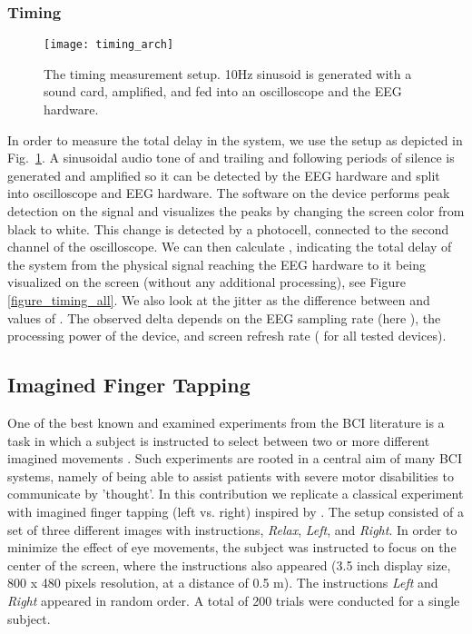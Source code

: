 \documentclass[10pt]{article}
\begin{document}
\begin{center}
		\subsubsection{Timing}
\begin{figure}[!t]
\centering
\texttt{[image: timing\_arch]}
\caption{The timing measurement setup. 10Hz sinusoid is generated with a sound card, amplified, and fed into an oscilloscope and the EEG hardware.}
\label{figure_timing_arch}
\end{figure}
In order to measure the total delay in the system, we use the setup as depicted in Fig.~\ref{figure_timing_arch}. A sinusoidal audio tone of  and trailing and following periods of silence is generated and amplified so it can be detected by the EEG hardware and split into oscilloscope and EEG hardware. The software on the device performs peak detection on the signal and visualizes the peaks by changing the screen color from black to white. This change is detected by a photocell, connected to the second channel of the oscilloscope. We can then calculate , indicating the total delay of the system from the physical signal reaching the EEG hardware to it being visualized on the screen (without any additional processing), see Figure \ref{figure_timing_all}. We also look at the jitter  as the difference between  and  values of . The observed delta depends on the EEG sampling rate (here ), the processing power of the device, and screen refresh rate ( for all tested devices).

	\subsection{Imagined Finger Tapping}
One of the best known and examined experiments from the BCI literature is a task in which a subject is instructed to select between two or more different imagined movements \cite{Muller-Gerking1999:DesigningOptimalSpatialFilters,Babiloni2000:LinearClassLowResEEGImagHand,Dornhege2004,Blankertz2006:BerlinBCI}. Such experiments are rooted in a central aim of many BCI systems, namely of being able to assist patients with severe motor disabilities to communicate by 'thought'.
In this contribution we replicate a classical experiment with imagined finger tapping (left vs. right) inspired by \cite{Blankertz2006:BerlinBCI}. The setup consisted of a set of three different images with instructions, \textit{Relax}, \textit{Left}, and \textit{Right}. In order to minimize the effect of eye movements, the subject was instructed to focus on the center of the screen, where the instructions also appeared (3.5 inch display size, 800 x 480 pixels resolution, at a distance of 0.5 m). The instructions \textit{Left} and \textit{Right} appeared in random order. A total of 200 trials were conducted for a single subject.


\end{center}
\end{document}
